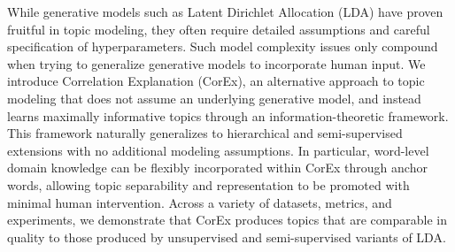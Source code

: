 While generative models such as Latent Dirichlet Allocation (LDA) have proven fruitful in topic modeling, they often require detailed assumptions and careful specification of hyperparameters. Such model complexity issues only compound when trying to generalize generative models to incorporate human input. We introduce Correlation Explanation (CorEx), an alternative approach to topic modeling that does not assume an underlying generative model, and instead learns maximally informative topics through an information-theoretic framework. This framework naturally generalizes to hierarchical and semi-supervised extensions with no additional modeling assumptions. In particular, word-level domain knowledge can be flexibly incorporated within CorEx through anchor words, allowing topic separability and representation to be promoted with minimal human intervention. Across a variety of datasets, metrics, and experiments, we demonstrate that CorEx produces topics that are comparable in quality to those produced by unsupervised and semi-supervised variants of LDA.
